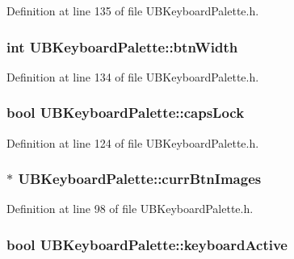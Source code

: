 Definition at line 135 of file U\-B\-Keyboard\-Palette.\-h.

\hypertarget{class_u_b_keyboard_palette_a2703020b8e54ecb7dbd47b5a59e70389}{
\subsubsection[{btn\-Width}]{\setlength{\rightskip}{0pt plus 5cm}int U\-B\-Keyboard\-Palette\-::btn\-Width\hspace{0.3cm}{\ttfamily [protected]}}}\label{d6/d6e/class_u_b_keyboard_palette_a2703020b8e54ecb7dbd47b5a59e70389}


Definition at line 134 of file U\-B\-Keyboard\-Palette.\-h.

\hypertarget{class_u_b_keyboard_palette_a8cce464c5b9974a0b7f83975310fc4af}{
\subsubsection[{caps\-Lock}]{\setlength{\rightskip}{0pt plus 5cm}bool U\-B\-Keyboard\-Palette\-::caps\-Lock\hspace{0.3cm}{\ttfamily [protected]}}}\label{d6/d6e/class_u_b_keyboard_palette_a8cce464c5b9974a0b7f83975310fc4af}


Definition at line 124 of file U\-B\-Keyboard\-Palette.\-h.

\hypertarget{class_u_b_keyboard_palette_a9d0abd15cff143a07e6af72ef606e3bd}{
\subsubsection[{curr\-Btn\-Images}]{$\ast$ U\-B\-Keyboard\-Palette\-::curr\-Btn\-Images}}\label{d6/d6e/class_u_b_keyboard_palette_a9d0abd15cff143a07e6af72ef606e3bd}


Definition at line 98 of file U\-B\-Keyboard\-Palette.\-h.

\hypertarget{class_u_b_keyboard_palette_aef54c43da0af803602863f013f643aaa}{
\subsubsection[{keyboard\-Active}]{\setlength{\rightskip}{0pt plus 5cm}bool U\-B\-Keyboard\-Palette\-::keyboard\-Active\hspace{0.3cm}{\ttfamily [protected]}}}\label{d6/d6e/class_u_b_keyboard_palette_aef54c43da0af803602863f013f643aaa}


